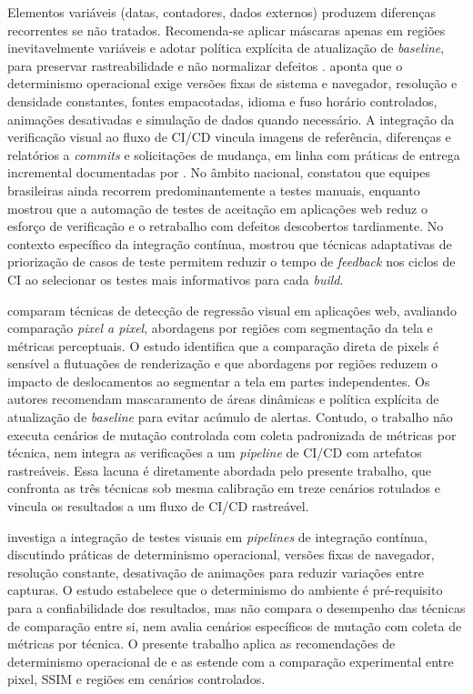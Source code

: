\documentclass{UNESC}
\begin{document}
Elementos variáveis (datas, contadores, dados externos) produzem diferenças recorrentes se não tratados. Recomenda-se aplicar máscaras apenas em regiões inevitavelmente variáveis e adotar política explícita de atualização de \emph{baseline}, para preservar rastreabilidade e não normalizar defeitos \cite{tanno2020,heinonen2020}.  aponta que o determinismo operacional exige versões fixas de sistema e navegador, resolução e densidade constantes, fontes empacotadas, idioma e fuso horário controlados, animações desativadas e simulação de dados quando necessário. A integração da verificação visual ao fluxo de CI/CD vincula imagens de referência, diferenças e relatórios a \emph{commits} e solicitações de mudança, em linha com práticas de entrega incremental documentadas por . No âmbito nacional,  constatou que equipes brasileiras ainda recorrem predominantemente a testes manuais, enquanto  mostrou que a automação de testes de aceitação em aplicações web reduz o esforço de verificação e o retrabalho com defeitos descobertos tardiamente. No contexto específico da integração contínua,  mostrou que técnicas adaptativas de priorização de casos de teste permitem reduzir o tempo de \emph{feedback} nos ciclos de CI ao selecionar os testes mais informativos para cada \emph{build}.

 comparam técnicas de detecção de regressão visual em aplicações web, avaliando comparação \emph{pixel a pixel}, abordagens por regiões com segmentação da tela e métricas perceptuais. O estudo identifica que a comparação direta de pixels é sensível a flutuações de renderização e que abordagens por regiões reduzem o impacto de deslocamentos ao segmentar a tela em partes independentes. Os autores recomendam mascaramento de áreas dinâmicas e política explícita de atualização de \emph{baseline} para evitar acúmulo de alertas. Contudo, o trabalho não executa cenários de mutação controlada com coleta padronizada de métricas por técnica, nem integra as verificações a um \emph{pipeline} de CI/CD com artefatos rastreáveis. Essa lacuna é diretamente abordada pelo presente trabalho, que confronta as três técnicas sob mesma calibração em treze cenários rotulados e vincula os resultados a um fluxo de CI/CD rastreável.

 investiga a integração de testes visuais em \emph{pipelines} de integração contínua, discutindo práticas de determinismo operacional, versões fixas de navegador, resolução constante, desativação de animações para reduzir variações entre capturas. O estudo estabelece que o determinismo do ambiente é pré-requisito para a confiabilidade dos resultados, mas não compara o desempenho das técnicas de comparação entre si, nem avalia cenários específicos de mutação com coleta de métricas por técnica. O presente trabalho aplica as recomendações de determinismo operacional de  e as estende com a comparação experimental entre pixel, SSIM e regiões em cenários controlados.
\end{document}

